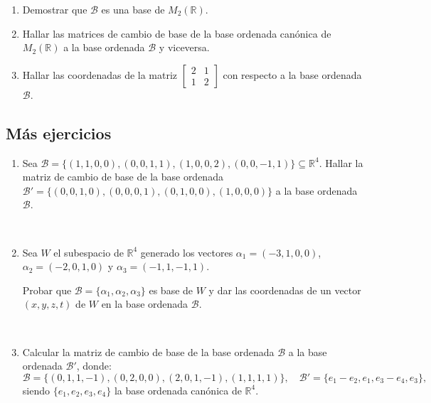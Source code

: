 \documentclass[12pt]{amsart}
\begin{document}
\begin{enumerate}
\begin{enumerate}
	\item Demostrar que $\mathcal{B}$ es una base de $M_2(\mathbb R)$.
	

	\item Hallar las matrices de cambio de base de la base ordenada can\'onica de $M_2(\mathbb R)$ a la base ordenada $\mathcal{B}$ y viceversa.
		
	\item Hallar las coordenadas de la matriz
	$
	\begin{bmatrix}
	2 & 1\\
	1 & 2
	\end{bmatrix}$ con respecto a la base ordenada $\mathcal{B}$.
\end{enumerate}


\end{enumerate}

\subsection*{M\'as ejercicios}

\begin{enumerate}

\item Sea $\mathcal{B}=
\{ (1, 1, 0, 0), (0,0,1,1), (1, 0, 0, 2), (0, 0, -1, 1)\} \subseteq \mathbb R^4$.
Hallar la matriz de cambio de base de la base ordenada $\mathcal B' = \{(0, 0, 1, 0), (0, 0, 0, 1), (0, 1, 0, 0), (1, 0, 0, 0)\}$ a la base ordenada $\mathcal{B}$.


\


\item  Sea $W$ el subespacio de $\mathbb R^4$ generado los vectores $\alpha_1 = (-3, 1, 0, 0)$, $\alpha_2 = (-2, 0, 1, 0)$ y $\alpha_3 = (-1,1,-1,1)$.

Probar que $\mathcal B = \{\alpha_1, \alpha_2, \alpha_3\}$ es  base de $W$ y dar las coordenadas de un vector $(x, y, z, t)$ de $W$ en la base ordenada $\mathcal B$.

\

\item Calcular la matriz de cambio de base de la base ordenada $\mathcal B$ a la base ordenada $\mathcal B'$, donde:
\begin{equation*}\mathcal B  = \{ (0, 1, 1, -1), (0, 2, 0, 0), (2, 0, 1,
-1), (1, 1, 1, 1)\}, \quad \mathcal B'  = \{ e_1-e_2, e_1, e_3-e_4,
e_3\},\end{equation*} siendo $\{ e_1, e_2, e_3, e_4\}$ la base
ordenada can\' onica de $\mathbb R^4$.

\end{enumerate}
\end{document}
